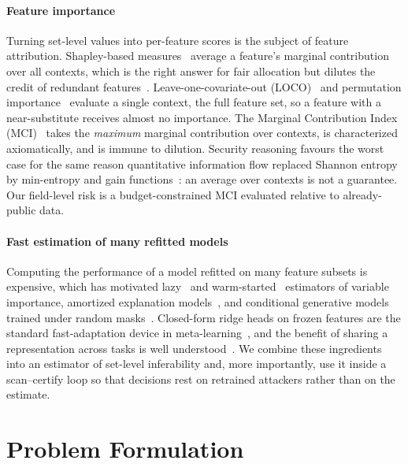 \paragraph{Feature importance}
Turning set-level values into per-feature scores is the subject of feature attribution.
Shapley-based measures~\cite{shapley1953value,lundberg2017shap,covert2020sage,williamson2020spvim}
average a feature's marginal contribution over all contexts, which is the right answer for
fair allocation but dilutes the credit of redundant features~\cite{kumar2020shapley,catav2021mci}.
Leave-one-covariate-out (LOCO)~\cite{lei2018loco} and permutation importance~\cite{breiman2001rf,fisher2019mcr,hooker2021unrestricted}
evaluate a single context, the full feature set, so a feature with a near-substitute receives
almost no importance. The Marginal Contribution Index (MCI)~\cite{catav2021mci} takes the
\emph{maximum} marginal contribution over contexts, is characterized axiomatically, and is
immune to dilution. Security reasoning favours the worst case for the same reason
quantitative information flow replaced Shannon entropy by min-entropy and gain
functions~\cite{smith2009qif,alvim2012gleakage}: an average over contexts is not a guarantee.
Our field-level risk is a budget-constrained MCI evaluated relative to already-public data.

\paragraph{Fast estimation of many refitted models}
Computing the performance of a model refitted on many feature subsets is expensive, which has
motivated lazy~\cite{gao2022lazyvi} and warm-started~\cite{sun2025warmstart} estimators of
variable importance, amortized explanation models~\cite{jethani2022fastshap,covert2023vitshapley},
and conditional generative models trained under random masks~\cite{ivanov2019vaeac,li2020acflow,yoon2020vime,he2022mae}.
Closed-form ridge heads on frozen features are the standard fast-adaptation device in
meta-learning~\cite{bertinetto2019r2d2,lee2019metaoptnet}, and the benefit of sharing a
representation across tasks is well understood~\cite{caruana1997multitask,baxter2000inductive,maurer2016benefit}.
We combine these ingredients into an estimator of set-level inferability and, more
importantly, use it inside a scan--certify loop so that decisions rest on retrained
attackers rather than on the estimate.

\section{Problem Formulation}\label{sec:problem}

